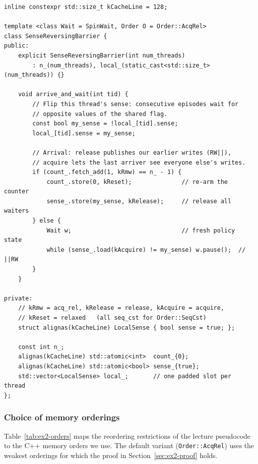 \begin{lstlisting}[caption={Sense-reversing barrier (\texttt{barriers.hpp}).},label={lst:ex2-srb}]
inline constexpr std::size_t kCacheLine = 128;

template <class Wait = SpinWait, Order O = Order::AcqRel>
class SenseReversingBarrier {
public:
    explicit SenseReversingBarrier(int num_threads)
        : n_(num_threads), local_(static_cast<std::size_t>(num_threads)) {}

    void arrive_and_wait(int tid) {
        // Flip this thread's sense: consecutive episodes wait for
        // opposite values of the shared flag.
        const bool my_sense = !local_[tid].sense;
        local_[tid].sense = my_sense;

        // Arrival: release publishes our earlier writes (RW||),
        // acquire lets the last arriver see everyone else's writes.
        if (count_.fetch_add(1, kRmw) == n_ - 1) {
            count_.store(0, kReset);              // re-arm the counter
            sense_.store(my_sense, kRelease);     // release all waiters
        } else {
            Wait w;                               // fresh policy state
            while (sense_.load(kAcquire) != my_sense) w.pause();  // ||RW
        }
    }

private:
    // kRmw = acq_rel, kRelease = release, kAcquire = acquire,
    // kReset = relaxed   (all seq_cst for Order::SeqCst)
    struct alignas(kCacheLine) LocalSense { bool sense = true; };

    const int n_;
    alignas(kCacheLine) std::atomic<int>  count_{0};
    alignas(kCacheLine) std::atomic<bool> sense_{true};
    std::vector<LocalSense> local_;       // one padded slot per thread
};
\end{lstlisting}

\subsubsection{Choice of memory orderings}
\label{sec:ex2-orders}

Table~\ref{tab:ex2-orders} maps the reordering restrictions of the lecture
pseudocode to the C++ memory orders we use. The default variant
(\texttt{Order::AcqRel}) uses the weakest orderings for which the proof in
Section~\ref{sec:ex2-proof} holds.

